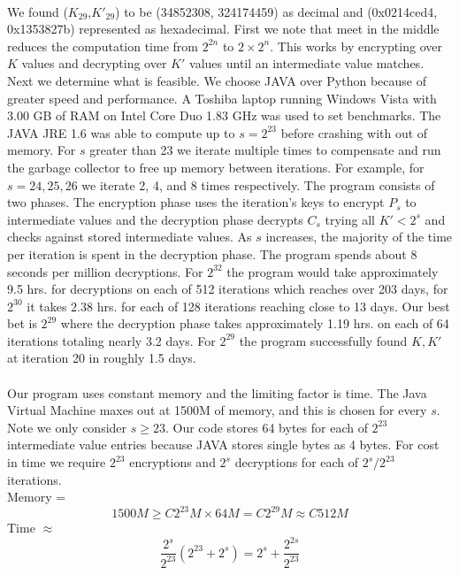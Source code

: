 \documentclass[11pt]{article}
\begin{document}
\paragraph{}
We found ($K_{29}$,$K'_{29}$) to be (34852308, 324174459) as decimal and
(0x0214ced4, 0x1353827b) represented as hexadecimal. First we note
that meet in the middle reduces the computation time
from $2^{2n}$ to $2\times2^n$. This works by encrypting over
$K$ values and decrypting over $K'$ values until an intermediate value
matches. Next we determine what is feasible. We choose JAVA over Python
because of greater speed and performance. A Toshiba laptop running
Windows Vista with 3.00 GB of RAM on Intel Core Duo 1.83 GHz was used to set
benchmarks. The JAVA JRE 1.6 was able to compute up to $s = 2^{23}$ before
crashing with out of memory. For $s$ greater than 23 we iterate multiple
times to compensate and run the garbage collector to free up memory
between iterations. For example, for $s = 24,25,26$ we iterate 2, 4, and 8
times respectively. The program consists of two phases. The encryption
phase uses the iteration's keys to encrypt $P_s$ to intermediate values and the
decryption phase decrypts $C_s$ trying all $K' < 2^s$ and checks against
stored intermediate values. As $s$ increases, the majority of the time
per iteration is spent in the decryption phase. The program spends about
8 seconds per million decryptions. For $2^{32}$ the program would take
approximately 9.5 hrs. for decryptions on each of 512 iterations which reaches
over 203 days, for $2^{30}$ it takes 2.38 hrs. for each of 128
iterations reaching close to 13 days. Our best bet is $2^{29}$ where the
decryption phase takes approximately 1.19 hrs. on each of 64 iterations
totaling nearly 3.2 days. For $2^{29}$ the program successfully found
$K,K'$ at iteration 20 in roughly 1.5 days. 

\paragraph{}
Our program uses constant memory and the
limiting factor is time. The Java Virtual Machine maxes out at 1500M of
memory, and this is chosen for every $s$. Note we only consider $s \geq
23$. Our code stores 64 bytes for each of $2^{23}$ intermediate value
entries because JAVA stores single bytes as 4 bytes. 
For cost in time we require $2^{23}$ encryptions and $2^s$ decryptions
for each of $2^s/2^{23}$ iterations. \\

Memory = 
\begin{equation}
1500M  \geq C2^{23}M \times 64M = C2^{29}M \approx C512M
\end{equation}
Time $\approx$ 
\begin{equation}
\frac{2^s}{2^{23}}(2^{23} + 2^s) = 2^s + \frac{2^{2s}}{2^{23}}
\end{equation}
\end{document}
